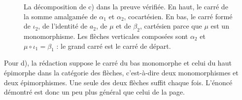 \begin{figure}[htbp]
\centering
{}
\caption{La décomposition de c) dans la preuve vérifiée. En haut, le carré de la somme amalgamée de $\alpha_1$ et $\alpha_2$, cocartésien. En bas, le carré formé de $\iota_2$, de l'identité de $a_2$, de $\mu$ et de $\beta_2$, cartésien parce que $\mu$ est un monomorphisme. Les flèches verticales composées sont $\alpha_2$ et $\mu \circ \iota_1 = \beta_1$ : le grand carré est le carré de départ.}
\label{fig:bourbaki-461}
\end{figure}

\begin{remarque}
Pour d), la rédaction suppose le carré du bas monomorphe et celui du haut épimorphe dans la catégorie des flèches, c'est-à-dire deux monomorphismes et deux épimorphismes. Une seule des deux flèches suffit chaque fois. L'énoncé démontré est donc un peu plus général que celui de la page.
\end{remarque}

